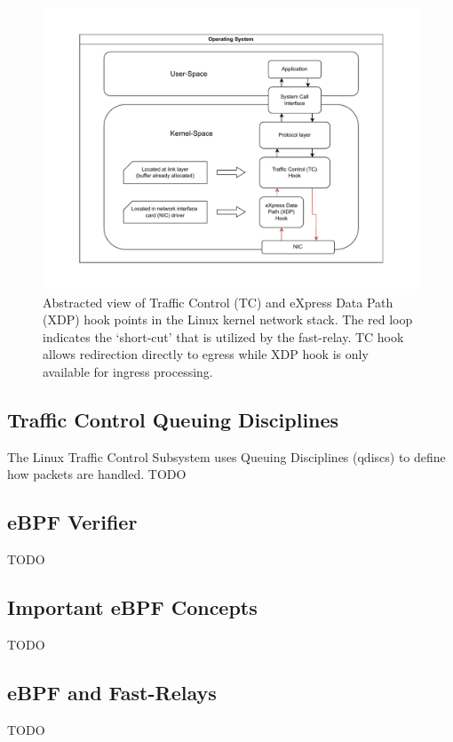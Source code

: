 \begin{figure}[htbp]
    \centering
    \includegraphics[width=\textwidth]{figures/02_background/ebpf-hooks.drawio.pdf}
    \caption{Abstracted view of Traffic Control (TC) and eXpress Data Path (XDP) hook points
    in the Linux kernel network stack.
    The red loop indicates the `short-cut' that is utilized by the fast-relay.
    TC hook allows redirection directly to egress while XDP hook is only available
    for ingress processing.
    }\label{fig:ebpf-hooks}
\end{figure}

\subsection{Traffic Control Queuing Disciplines}
The Linux Traffic Control Subsystem uses Queuing Disciplines (qdiscs) to define how packets
are handled. TODO

\subsection{eBPF Verifier}
TODO

\subsection{Important eBPF Concepts}
TODO

\subsection{eBPF and Fast-Relays}
TODO

